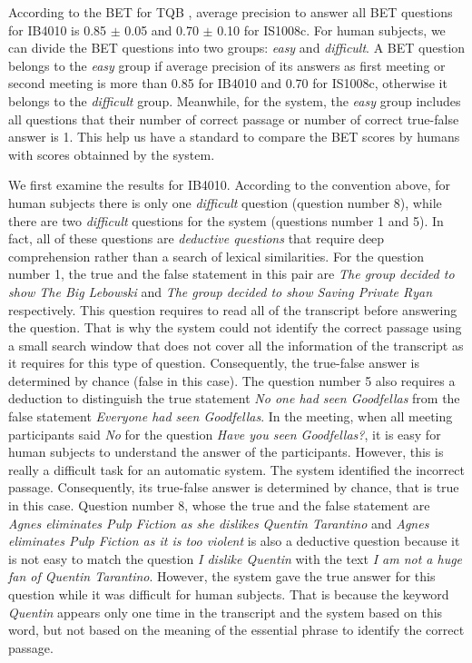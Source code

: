 

According to the BET for TQB \cite{popescubelis2007otm}, average precision to answer all BET questions for IB4010 is 0.85 \ensuremath{\pm} 0.05 and 0.70 \ensuremath{\pm} 0.10 for IS1008c. For human subjects, we can divide the BET questions into two groups: \textit{easy} and \textit{difficult}. A BET question belongs to the \textit{easy} group  if average precision of its answers as first meeting or second meeting is more than 0.85 for IB4010 and 0.70 for IS1008c, otherwise it belongs to the \textit{difficult} group. Meanwhile, for the system, the \textit{easy} group includes all questions that  their number of correct passage or number of correct true-false answer is 1.
This help us have a standard to compare the BET scores by humans with scores obtainned by the system.

We first examine the results for IB4010. According to the convention above, for human subjects there is only one \textit{difficult} question (question number 8), while there are two \textit{difficult} questions for the system (questions number 1 and 5). In fact, all of these questions are \textit{deductive questions} that require deep comprehension rather than a search of lexical similarities. For the question number 1, the true and the false statement in this pair are \textit{The group decided to show The Big Lebowski} and \textit{The group decided to show Saving Private Ryan} respectively. This question requires to read all of the transcript before answering the question. That is why the system could not identify the correct passage using a small search window that does not cover all the information of the transcript as it requires for this type of question. Consequently, the true-false answer is determined by chance (false in this case). The question number 5 also requires a deduction to distinguish the true statement \textit{No one had seen Goodfellas} from the false statement \textit{Everyone  had seen Goodfellas}. In the meeting, when all meeting participants said \textit{No} for the question \textit{Have you seen Goodfellas?}, it is easy for human subjects to understand the answer of the participants. However, this is really a difficult task for an automatic system.  The system identified the incorrect passage. Consequently, its true-false answer is determined by chance, that is true in this case. Question number 8, whose the true and the false statement are \textit{Agnes eliminates Pulp Fiction as she dislikes Quentin Tarantino} and \textit{Agnes eliminates Pulp Fiction as it is too violent} is also a deductive question because it is not easy to match the question \textit{I dislike Quentin} with the text \textit{I am not a huge fan of Quentin Tarantino}. However, the system gave the true answer for this question while it was difficult for human subjects. That is because the keyword \textit{Quentin} appears only one time in the transcript and the system based on this word, but not based on the meaning of the essential phrase to identify the correct passage.


